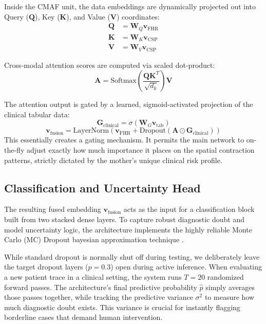\documentclass[conference]{IEEEtran}
\begin{document}
Inside the CMAF unit, the data embeddings are dynamically projected out into Query ($\mathbf{Q}$), Key ($\mathbf{K}$), and Value ($\mathbf{V}$) coordinates:
\begin{align}
    \mathbf{Q} &= \mathbf{W}_Q \mathbf{v}_{\text{FHR}} \\
    \mathbf{K} &= \mathbf{W}_K \mathbf{v}_{\text{CSP}} \\
    \mathbf{V} &= \mathbf{W}_V \mathbf{v}_{\text{CSP}}
\end{align}

Cross-modal attention scores are computed via scaled dot-product:
\begin{equation}
    \mathbf{A} = \text{Softmax}\left(\frac{\mathbf{Q} \mathbf{K}^T}{\sqrt{d_k}}\right) \mathbf{V}
\end{equation}

The attention output is gated by a learned, sigmoid-activated projection of the clinical tabular data:
\begin{equation}
    \mathbf{G}_{\text{clinical}} = \sigma(\mathbf{W}_G \mathbf{v}_{\text{tab}})
\end{equation}
\begin{equation}
    \mathbf{v}_{\text{fusion}} = \text{LayerNorm}(\mathbf{v}_{\text{FHR}} + \text{Dropout}(\mathbf{A} \odot \mathbf{G}_{\text{clinical}}))
\end{equation}
This essentially creates a gating mechanism. It permits the main network to on-the-fly adjust exactly how much importance it places on the spatial contraction patterns, strictly dictated by the mother's unique clinical risk profile.

\subsection{Classification and Uncertainty Head}
The resulting fused embedding $\mathbf{v}_{\text{fusion}}$ acts as the input for a classification block built from two stacked dense layers. To capture robust diagnostic doubt and model uncertainty logic, the architecture implements the highly reliable Monte Carlo (MC) Dropout bayesian approximation technique \cite{gal2016}. 

While standard dropout is normally shut off during testing, we deliberately leave the target dropout layers ($p=0.3$) open during active inference. When evaluating a new patient trace in a clinical setting, the system runs $T=20$ randomized forward passes. The architecture's final predictive probability $\hat{p}$ simply averages those passes together, while tracking the predictive variance $\sigma^2$ to measure how much diagnostic doubt exists. This variance is crucial for instantly flagging borderline cases that demand human intervention.
\end{document}

